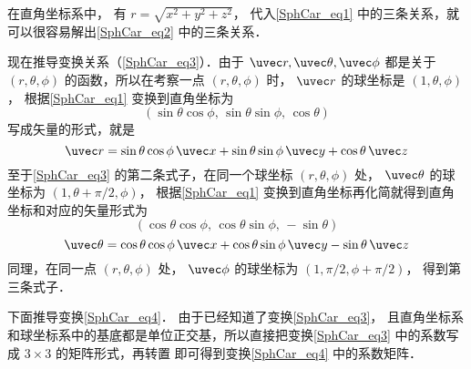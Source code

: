 在直角坐标系中， 有 $r = \sqrt {x^2 + y^2 + z^2}$， 代入\autoref{SphCar_eq1} 中的三条关系，就可以很容易解出\autoref{SphCar_eq2} 中的三条关系．

现在推导变换关系（\autoref{SphCar_eq3}）．由于 $\uvec r,\uvec \theta ,\uvec \phi $ 都是关于 $(r, \theta, \phi)$ 的函数，所以在考察一点 $(r, \theta, \phi)$ 时， $\uvec r$ 的球坐标是 $(1, \theta, \phi)$，  根据\autoref{SphCar_eq1} 变换到直角坐标为
\begin{equation}
(\sin \theta \cos \phi,\,\sin \theta \sin \phi,\,\cos \theta)
\end{equation}
写成矢量的形式，就是
 \begin{equation}
\uvec r = \sin \theta \cos \phi \,\uvec x + \sin \theta \sin \phi \,\uvec y + \cos \theta \,\uvec z
\end{equation}
至于\autoref{SphCar_eq3} 的第二条式子，在同一个球坐标 $(r,\theta ,\phi)$ 处， $\uvec \theta $ 的球坐标为 $(1, \theta + \pi /2, \phi)$， 根据\autoref{SphCar_eq1} 变换到直角坐标再化简就得到直角坐标和对应的矢量形式为
\begin{equation}
(\cos \theta \cos \phi ,\,\cos \theta \sin \phi , \,- \sin \theta)
\end{equation}
\begin{equation}
\uvec \theta  = \cos \theta \cos \phi \,\uvec x + \cos \theta \sin \phi \,\uvec y - \sin \theta \,\uvec z
\end{equation}
同理，在同一点 $(r, \theta, \phi)$ 处， $\uvec \phi $ 的球坐标为 $(1, \pi /2, \phi + \pi /2)$，  得到第三条式子．

下面推导变换\autoref{SphCar_eq4}． 由于已经知道了变换\autoref{SphCar_eq3}， 且直角坐标系和球坐标系中的基底都是单位正交基，所以直接把变换\autoref{SphCar_eq3} 中的系数写成 $3 \times 3$ 的矩阵形式，再转置 %
即可得到变换\autoref{SphCar_eq4} 中的系数矩阵．%

